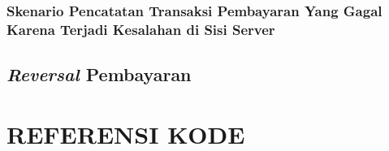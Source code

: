 \documentclass[pdftex,12pt, oneside]{article}
\begin{document}
  \subsubsection{Skenario Pencatatan Transaksi Pembayaran Yang Gagal Karena Terjadi Kesalahan di Sisi Server}  

\subsection{\textit{Reversal} Pembayaran}

\section{REFERENSI KODE}
\end{document}
